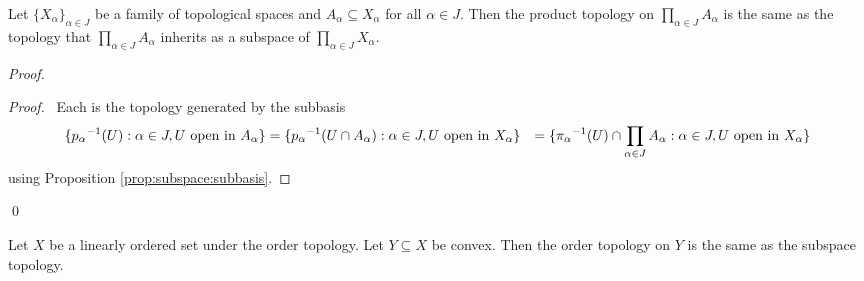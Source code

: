 \begin{prop}
  Let $\{ X_\alpha \}_{\alpha \in J}$ be a family of topological spaces and $A_\alpha \subseteq X_\alpha$ for all $\alpha \in J$. Then the product topology on $\prod_{\alpha \in J} A_\alpha$ is the same as the topology that $\prod_{\alpha \in J} A_\alpha$ inherits as a subspace of $\prod_{\alpha \in J} X_\alpha$.
\end{prop}

\begin{proof}
  \pf
  \begin{proof}
    \pf\ Each is the topology generated by the subbasis
    \begin{align*}
      \{ {p_\alpha}^{-1}(U) : \alpha \in J, U \text{ open in } A_\alpha \}
      & = \{ {p_\alpha}^{-1}(U \cap A_\alpha) : \alpha \in J, U \text{ open in } X_\alpha \}
      & = \{ {\pi_\alpha}^{-1}(U) \cap \prod_{\alpha \in J} A_\alpha : \alpha \in J, U \text{ open in } X_\alpha \}
    \end{align*}
    using Proposition \ref{prop:subspace:subbasis}.
  \end{proof}
  \qed
\end{proof}

\begin{prop}
  Let $X$ be a linearly ordered set under the order topology. Let $Y \subseteq X$ be convex. Then the order topology on $Y$ is the same as the subspace topology.
\end{prop}

